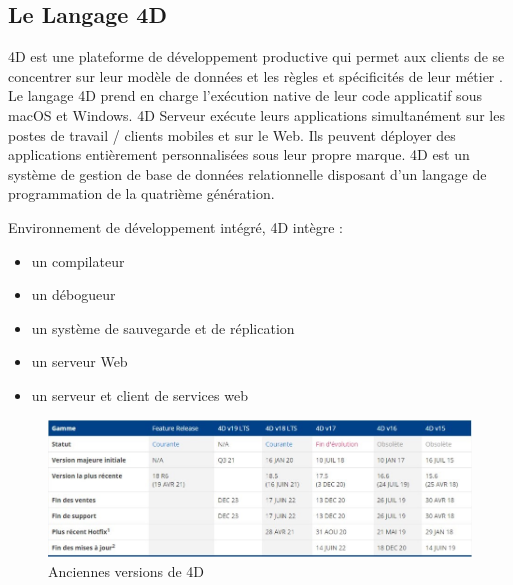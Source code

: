 
\subsection{Le Langage 4D}

4D est une plateforme de développement productive qui permet aux clients
 de se concentrer sur leur modèle de données et les règles 
 et spécificités de leur métier \cite{ref1}.
 Le langage 4D prend en charge l’exécution native 
 de leur code applicatif sous macOS et Windows. 
 4D Serveur exécute leurs applications simultanément sur les postes de travail
/ clients mobiles et sur le Web. Ils peuvent déployer des applications 
entièrement personnalisées sous leur propre marque.
 4D est un système de gestion de base de données 
 relationnelle disposant d’un langage de programmation 
 de la quatrième génération.
\newline

Environnement de développement intégré, 4D intègre :
\begin{itemize}
    \item un compilateur
    \item un débogueur
    \item un système de sauvegarde et de réplication
    \item un serveur Web
    \item un serveur et client de services web
\end{itemize}

\begin{figure}[h]
    \centering
    \includegraphics[scale=0.7]{Figures/versions.jpg} %
    \caption{Anciennes versions de 4D}
    \label{fig:AncienneVersions}
\end{figure}


